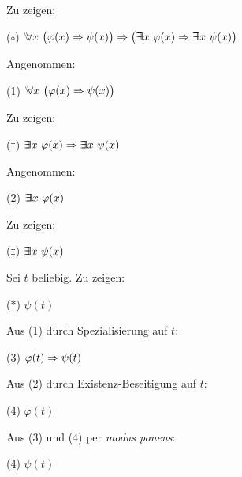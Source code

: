 \documentclass[a4paper]{article}
\newcommand{\Ex}{\Exists}
\begin{document}
Zu zeigen:

\vspace{2pt}
($\circ$) \hspace*{1em} $\Forall x \ \big(\varphi(x) \Then \psi(x)\big) \Then \big(\Ex x \ \varphi(x) \Then \Ex x \ \psi(x)\big)$

\vspace{2pt}
Angenommen:

\vspace{2pt}
(1) \hspace*{1em}  $\Forall x \ \big(\varphi(x) \Then \psi(x)\big)$

\vspace{2pt}
Zu zeigen: 

\vspace{2pt}
($\dagger$) \hspace*{1em}  $\Ex x \ \varphi(x) \Then \Ex x \ \psi(x)$

\vspace{2pt}
Angenommen:

\vspace{2pt}
(2) \hspace*{1em}  $\Ex x \ \varphi(x)$

\vspace{2pt}
Zu zeigen:

\vspace{2pt}
($\ddagger$) \hspace*{1em} $\Ex x \ \psi(x)$

\vspace{2pt}
Sei $t$ beliebig. Zu zeigen:

\vspace{2pt}
($\ast$) \hspace*{1em}  $\psi(t)$

\vspace{2pt}
Aus (1) durch Spezialisierung auf $t$:

\vspace{2pt}
(3) \hspace*{1em} $\varphi(t) \Rightarrow \psi(t)$

\vspace{2pt}
Aus (2) durch Existenz-Beseitigung auf $t$:

\vspace{2pt}
(4) \hspace*{1em} $\varphi(t)$

\vspace{2pt}
Aus (3) und (4) per \emph{modus ponens}:

\vspace{2pt}
(4) \hspace*{1em} $\psi(t)$
\end{document}
